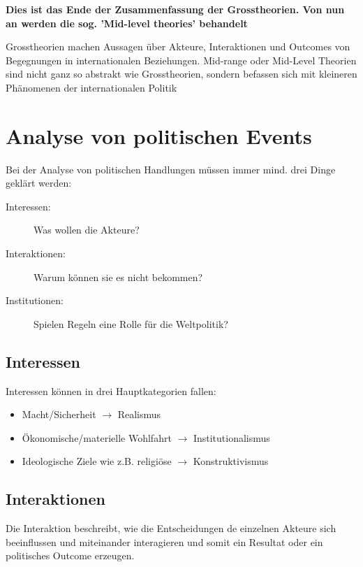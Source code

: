 \documentclass[a4paper, 11pt]{article}
\begin{document}
\hrulefill

\vspace{10px}

\noindent \textbf{Dies ist das Ende der Zusammenfassung der Grosstheorien. Von nun an werden die sog. 'Mid-level theories' behandelt}

\vspace{10px}

\hrulefill

\vspace{30px}

\noindent Grosstheorien machen Aussagen über Akteure, Interaktionen und Outcomes von Begegnungen in internationalen Beziehungen. Mid-range oder Mid-Level Theorien sind nicht ganz so abstrakt wie Grosstheorien, sondern befassen sich mit kleineren Phänomenen der internationalen Politik

\newpage

\section{Analyse von politischen Events}

Bei der Analyse von politischen Handlungen müssen immer mind. drei Dinge geklärt werden:

\begin{description}
	\item[Interessen: ] Was wollen die Akteure?
	\item[Interaktionen:] Warum können sie es nicht bekommen?
	\item[Institutionen: ] Spielen Regeln eine Rolle für die Weltpolitik?
\end{description}

\subsection{Interessen}
Interessen können in drei Hauptkategorien fallen:

\begin{itemize}
	\item Macht/Sicherheit $\rightarrow$ Realismus
	\item Ökonomische/materielle Wohlfahrt $\rightarrow$ Institutionalismus
	\item Ideologische Ziele wie z.B. religiöse $\rightarrow$ Konstruktivismus
\end{itemize}

\subsection{Interaktionen}
Die Interaktion beschreibt, wie die Entscheidungen de einzelnen Akteure sich beeinflussen und miteinander interagieren und somit ein Resultat oder ein politisches Outcome erzeugen.
\end{document}
